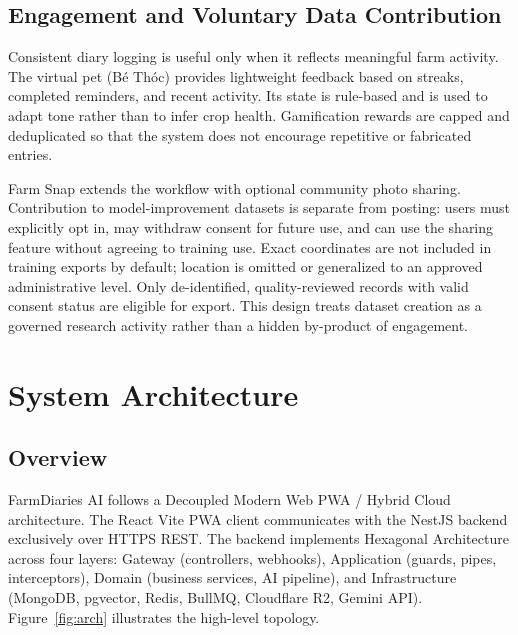 \documentclass[conference]{IEEEtran}
\begin{document}
\subsection{Engagement and Voluntary Data Contribution}

Consistent diary logging is useful only when it reflects meaningful farm activity. The virtual pet (B\'{e} Th\'{o}c) provides lightweight feedback based on streaks, completed reminders, and recent activity. Its state is rule-based and is used to adapt tone rather than to infer crop health. Gamification rewards are capped and deduplicated so that the system does not encourage repetitive or fabricated entries.

Farm Snap extends the workflow with optional community photo sharing. Contribution to model-improvement datasets is separate from posting: users must explicitly opt in, may withdraw consent for future use, and can use the sharing feature without agreeing to training use. Exact coordinates are not included in training exports by default; location is omitted or generalized to an approved administrative level. Only de-identified, quality-reviewed records with valid consent status are eligible for export. This design treats dataset creation as a governed research activity rather than a hidden by-product of engagement.

\section{System Architecture}

\subsection{Overview}

FarmDiaries AI follows a Decoupled Modern Web PWA / Hybrid Cloud architecture. The React Vite PWA client communicates with the NestJS backend exclusively over HTTPS REST. The backend implements Hexagonal Architecture across four layers: Gateway (controllers, webhooks), Application (guards, pipes, interceptors), Domain (business services, AI pipeline), and Infrastructure (MongoDB, pgvector, Redis, BullMQ, Cloudflare R2, Gemini API). Figure~\ref{fig:arch} illustrates the high-level topology.
\end{document}
